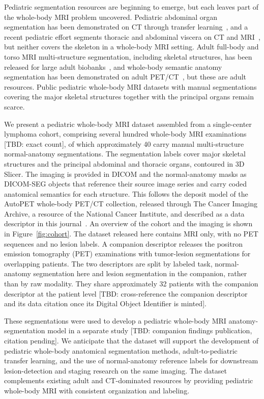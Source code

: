 Pediatric segmentation resources are beginning to emerge, but each leaves part of the whole-body MRI problem uncovered.
Pediatric abdominal organ segmentation has been demonstrated on CT through transfer learning~\cite{Somasundaram_2024}, and a recent pediatric effort segments thoracic and abdominal viscera on CT and MRI~\cite{Eicke_2026}, but neither covers the skeleton in a whole-body MRI setting.
Adult full-body and torso MRI multi-structure segmentation, including skeletal structures, has been released for large adult biobanks~\cite{Graf_2026}, and whole-body semantic anatomy segmentation has been demonstrated on adult PET/CT~\cite{Sundar_2022}, but these are adult resources.
Public pediatric whole-body MRI datasets with manual segmentations covering the major skeletal structures together with the principal organs remain scarce.

We present a pediatric whole-body MRI dataset assembled from a single-center lymphoma cohort, comprising several hundred whole-body MRI examinations [TBD: exact count], of which approximately 40 carry manual multi-structure normal-anatomy segmentations.
The segmentation labels cover major skeletal structures and the principal abdominal and thoracic organs, contoured in 3D Slicer.
The imaging is provided in DICOM and the normal-anatomy masks as DICOM-SEG objects that reference their source image series and carry coded anatomical semantics for each structure.
This follows the deposit model of the AutoPET whole-body PET/CT collection, released through The Cancer Imaging Archive, a resource of the National Cancer Institute, and described as a data descriptor in this journal~\cite{Gatidis_2022}.
An overview of the cohort and the imaging is shown in Figure~\ref{fig:cohort}.
The dataset released here contains MRI only, with no PET sequences and no lesion labels.
A companion descriptor releases the positron emission tomography (PET) examinations with tumor-lesion segmentations for overlapping patients.
The two descriptors are split by labeled task, normal-anatomy segmentation here and lesion segmentation in the companion, rather than by raw modality.
They share approximately 32 patients with the companion descriptor at the patient level [TBD: cross-reference the companion descriptor and its data citation once its Digital Object Identifier is minted].

These segmentations were used to develop a pediatric whole-body MRI anatomy-segmentation model in a separate study [TBD: companion findings publication, citation pending].
We anticipate that the dataset will support the development of pediatric whole-body anatomical segmentation methods, adult-to-pediatric transfer learning, and the use of normal-anatomy reference labels for downstream lesion-detection and staging research on the same imaging.
The dataset complements existing adult and CT-dominated resources by providing pediatric whole-body MRI with consistent organization and labeling.

